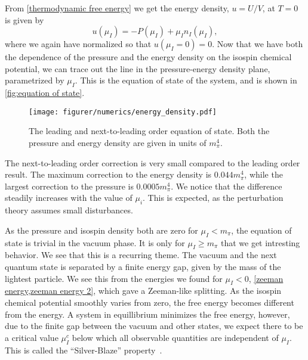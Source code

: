 From \cref{thermodynamic free energy} we get the energy density, $u = U/V$, at $T = 0$ is given by
\begin{equation}
    u(\mu_I) = -P(\mu_I) + \mu_I n_I(\mu_I),
\end{equation}
where we again have normalized so that $u(\mu_I = 0) = 0$.
Now that we have both the dependence of the pressure and the energy density on the isospin chemical potential, we can trace out the line in the pressure-energy density plane, parametrized by $\mu_I$.
This is the equation of state of the system, and is shown in \autoref{fig:equation of state}.

\begin{figure}[h]
    \centering
    \vspace{-0.2cm}
    \texttt{[image: figurer/numerics/energy\_density.pdf]}
    \caption{The leading and next-to-leading order equation of state. Both the pressure and energy density are given in units of $m_\pi^4$.}
    \label{fig:equation of state}
\end{figure}

The next-to-leading order correction is very small compared to the leading order result.
The maximum correction to the energy density is $0.044m_\pi^4$, while the largest correction to the pressure is $0.0005 m_\pi^4$.
We notice that the difference steadily increases with the value of $\mu_i$.
This is expected, as the perturbation theory assumes small disturbances.

As the pressure and isospin density both are zero for $\mu_I < m_\pi$, the equation of state is trivial in the vacuum phase.
It is only for $\mu_I \geq m_\pi$ that we get intresting behavior.
We see that this is a recurring theme.
The vacuum and the next quantum state is separated by a finite energy gap, given by the mass of the lightest particle.
We see this from the energies we found for $\mu_I < 0$, \cref{zeeman energy,zeeman energy 2}, which gave a Zeeman-like splitting.
As the isospin chemical potential smoothly varies from zero, the free energy becomes different from the energy.
A system in equillibrium minimizes the free energy, however, due to the finite gap between the vacuum and other states, we expect there to be a critical value $\mu_I^c$ below which all observable quantities are independent of $\mu_I$.
This is called the ``Silver-Blaze'' property~\cite{cohen:silver-blaze,cohen2}.


\FloatBarrier

